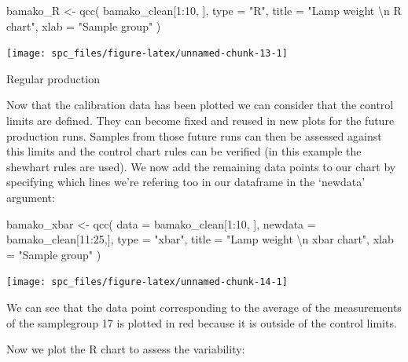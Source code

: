 \documentclass[
]{book}
\newenvironment{Shaded}{\begin{snugshade}}{\end{snugshade}}
\newcommand{\AttributeTok}[1]{\textcolor[rgb]{0.77,0.63,0.00}{#1}}
\newcommand{\DecValTok}[1]{\textcolor[rgb]{0.00,0.00,0.81}{#1}}
\newcommand{\FunctionTok}[1]{\textcolor[rgb]{0.00,0.00,0.00}{#1}}
\newcommand{\NormalTok}[1]{#1}
\newcommand{\OtherTok}[1]{\textcolor[rgb]{0.56,0.35,0.01}{#1}}
\newcommand{\SpecialCharTok}[1]{\textcolor[rgb]{0.00,0.00,0.00}{#1}}
\newcommand{\StringTok}[1]{\textcolor[rgb]{0.31,0.60,0.02}{#1}}
\begin{document}
\begin{Shaded}
\begin{Highlighting}[]
\NormalTok{bamako\_R }\OtherTok{\textless{}{-}} \FunctionTok{qcc}\NormalTok{(}
\NormalTok{  bamako\_clean[}\DecValTok{1}\SpecialCharTok{:}\DecValTok{10}\NormalTok{, ], }
  \AttributeTok{type =} \StringTok{"R"}\NormalTok{, }
  \AttributeTok{title =} \StringTok{"Lamp weight }\SpecialCharTok{\textbackslash{}n}\StringTok{ R chart"}\NormalTok{,}
  \AttributeTok{xlab =} \StringTok{"Sample group"}
\NormalTok{  )}
\end{Highlighting}
\end{Shaded}

\texttt{[image: spc\_files/figure-latex/unnamed-chunk-13-1]}

Regular production

Now that the calibration data has been plotted we can consider that the control limits are defined. They can become fixed and reused in new plots for the future production runs. Samples from those future runs can then be assessed against this limits and the control chart rules can be verified (in this example the shewhart rules are used). We now add the remaining data points to our chart by specifying which lines we're refering too in our dataframe in the `newdata' argument:

\begin{Shaded}
\begin{Highlighting}[]
\NormalTok{bamako\_xbar }\OtherTok{\textless{}{-}} \FunctionTok{qcc}\NormalTok{(}
  \AttributeTok{data =}\NormalTok{ bamako\_clean[}\DecValTok{1}\SpecialCharTok{:}\DecValTok{10}\NormalTok{, ],}
  \AttributeTok{newdata =}\NormalTok{ bamako\_clean[}\DecValTok{11}\SpecialCharTok{:}\DecValTok{25}\NormalTok{,],}
  \AttributeTok{type =} \StringTok{"xbar"}\NormalTok{, }
  \AttributeTok{title =} \StringTok{"Lamp weight }\SpecialCharTok{\textbackslash{}n}\StringTok{ xbar chart"}\NormalTok{, }
  \AttributeTok{xlab =} \StringTok{"Sample group"}
\NormalTok{  )}
\end{Highlighting}
\end{Shaded}

\texttt{[image: spc\_files/figure-latex/unnamed-chunk-14-1]}

We can see that the data point corresponding to the average of the measurements of the samplegroup 17 is plotted in red because it is outside of the control limits.

Now we plot the R chart to assess the variability:
\end{document}
